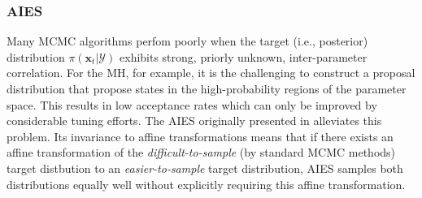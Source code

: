 \subsubsection{\acrfull{AIES}}
Many \acrshort{MCMC} algorithms perfom poorly when the target (i.e., posterior) distribution $\pi(\boldsymbol{x}_{t}|\mathcal{Y})$ exhibits strong, priorly unknown, inter-parameter correlation. For the \acrshort{MH}, for example, it is the challenging to construct a proposal distribution that propose states in the high-probability regions of the parameter space. This results in low acceptance rates which can only be improved by considerable tuning efforts. The \acrshort{AIES} originally presented in \citep{goodman2010} alleviates this problem. Its invariance to affine transformations means that if there exists an affine transformation of the \textit{difficult-to-sample} (by standard \acrshort{MCMC} methods) target distbution to an \textit{easier-to-sample} target distribution, \acrshort{AIES} samples both distributions equally well without explicitly requiring this affine transformation.

